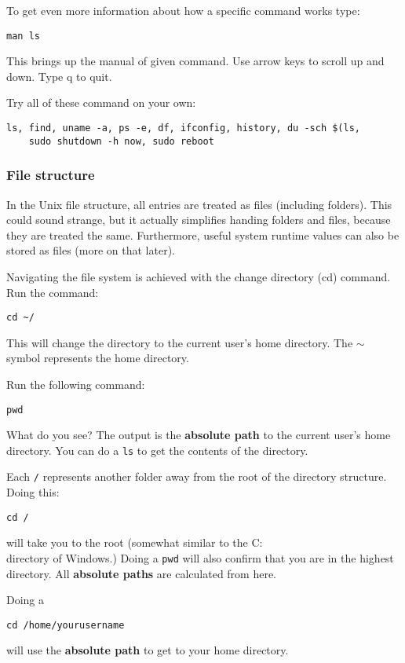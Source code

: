 \documentclass[a4paper]{article}
\begin{document}
To get even more information about how a specific command works type: 
\begin{lstlisting}
man ls
\end{lstlisting}
This brings up the manual of given command. Use arrow keys to scroll up and down. Type q to quit. 

Try all of these command on your own:
\begin{lstlisting}
ls, find, uname -a, ps -e, df, ifconfig, history, du -sch $(ls, 
	sudo shutdown -h now, sudo reboot
\end{lstlisting}

\subsubsection{File structure}
In the Unix file structure, all entries are treated as files (including folders). This could sound strange, but it actually simplifies handing folders and files, because they are treated the same. Furthermore, useful system runtime values can also be stored as files (more on that later). 

Navigating the file system is achieved with the change directory (cd) command. Run the command: 

\begin{lstlisting}
cd ~/
\end{lstlisting}
This will change the directory to the current user's home directory. The $\sim$ symbol represents the home directory. 

Run the following command: 
\begin{lstlisting}
pwd
\end{lstlisting}
What do you see? The output is the \textbf{absolute path} to the current user's home directory. You can do a \texttt{ls} to get the contents of the directory. 

Each \texttt{/} represents another folder away from the root of the directory structure. Doing this:
\begin{lstlisting}
cd /
\end{lstlisting}
will take you to the root (somewhat similar to the C:\\ directory of Windows.) Doing a \texttt{pwd} will also confirm that you are in the highest directory. All \textbf{absolute paths} are calculated from here.

Doing a 
\begin{lstlisting}
cd /home/yourusername
\end{lstlisting}
will use the \textbf{absolute path} to get to your home directory.
\end{document}
